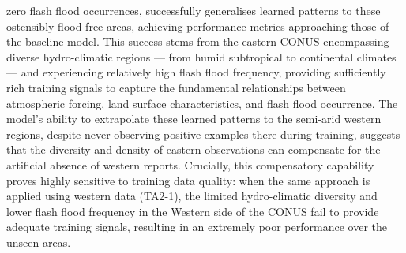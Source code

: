 zero flash flood occurrences, successfully generalises learned patterns to these ostensibly flood-free areas, achieving performance metrics approaching those of the baseline model. This success stems from the eastern CONUS encompassing diverse hydro-climatic regions — from humid subtropical to continental climates — and experiencing relatively high flash flood frequency, providing sufficiently rich training signals to capture the fundamental relationships between atmospheric forcing, land surface characteristics, and flash flood occurrence. The model's ability to extrapolate these learned patterns to the semi-arid western regions, despite never observing positive examples there during training, suggests that the diversity and density of eastern observations can compensate for the artificial absence of western reports. Crucially, this compensatory capability proves highly sensitive to training data quality: when the same approach is applied using western data (TA2-1), the limited hydro-climatic diversity and lower flash flood frequency in the Western side of the CONUS fail to provide adequate training signals, resulting in an extremely poor performance over the unseen areas.

